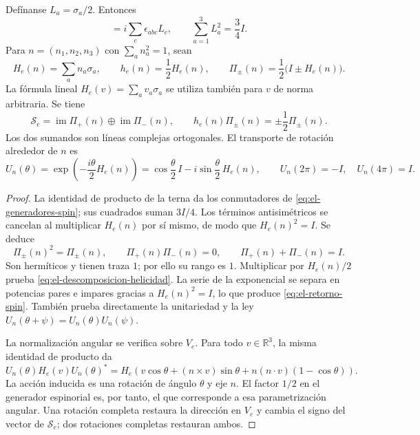 \begin{proposition}
\label{prop:el-helicidad}
Defínanse \(L_a=\sigma_a/2\). Entonces
\begin{equation}
 [L_a,L_b]=i\sum_c\epsilon_{abc}L_c,
 \qquad \sum_{a=1}^3L_a^2=\frac34 I.
 \label{eq:el-generadores-spin}
\end{equation}
Para \(n=(n_1,n_2,n_3)\) con \(\sum_an_a^2=1\), sean
\[
 H_e(n)=\sum_an_a\sigma_a,\qquad
 h_e(n)=\frac12H_e(n),\qquad
 \Pi_\pm(n)=\frac12\bigl(I\pm H_e(n)\bigr).
\]
La fórmula lineal \(H_e(v)=\sum_av_a\sigma_a\) se utiliza también
para \(v\) de norma arbitraria.
Se tiene
\begin{equation}
 \mathscr S_e=\operatorname{im}\Pi_+(n)
             \mathbin{\oplus}\operatorname{im}\Pi_-(n),
 \qquad
 h_e(n)\Pi_\pm(n)=\pm\frac12\Pi_\pm(n).
 \label{eq:el-descomposicion-helicidad}
\end{equation}
Los dos sumandos son líneas complejas ortogonales. El transporte de
rotación alrededor de \(n\) es
\begin{equation}
 U_n(\theta)=\exp\!\left(-\frac{i\theta}{2}H_e(n)\right)
 =\cos\frac\theta2\,I-i\sin\frac\theta2\,H_e(n),
 \qquad
 U_n(2\pi)=-I,\quad U_n(4\pi)=I.
 \label{eq:el-retorno-spin}
\end{equation}
\end{proposition}
\begin{proof}
La identidad de producto de la terna da los conmutadores de
\eqref{eq:el-generadores-spin}; sus cuadrados suman \(3I/4\).
Los términos antisimétricos se cancelan al multiplicar
\(H_e(n)\) por sí mismo, de modo que \(H_e(n)^2=I\).
Se deduce
\[
 \Pi_\pm(n)^2=\Pi_\pm(n),\qquad
 \Pi_+(n)\Pi_-(n)=0,\qquad \Pi_+(n)+\Pi_-(n)=I.
\]
Son hermíticos y tienen traza \(1\); por ello su rango es \(1\).
Multiplicar por \(H_e(n)/2\) prueba
\eqref{eq:el-descomposicion-helicidad}. La serie de la exponencial se
separa en potencias pares e impares gracias a \(H_e(n)^2=I\), lo que
produce \eqref{eq:el-retorno-spin}. También prueba directamente la
unitariedad y la ley \(U_n(\theta+\psi)=U_n(\theta)U_n(\psi)\).

La normalización angular se verifica sobre \(V_e\). Para todo
\(v\in\mathbb R^3\), la misma identidad de producto da
\[
 U_n(\theta)H_e(v)U_n(\theta)^*
 =H_e\!\left(v\cos\theta+(n\mathbin{\times}v)\sin\theta
       +n(n\mathbin{\cdot}v)(1-\cos\theta)\right).
\]
La acción inducida es una rotación de ángulo \(\theta\) y eje \(n\).
El factor \(1/2\) en el generador espinorial es, por tanto, el que
corresponde a esa parametrización angular. Una rotación completa restaura
la dirección en \(V_e\) y cambia el signo del vector de
\(\mathscr S_e\); dos rotaciones completas restauran ambos.
\end{proof}

